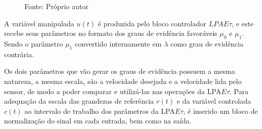 \begin{figure}[!h]
\label{fig:diagramaBlocosLPAEt}

{\vspace{0.2cm} \small Fonte: Próprio autor}
\end{figure}



A variável manipulada $u(t)$ é produzida pelo 
bloco controlador $LPAE\tau$, 
e este recebe seus parâmetros no formato dos 
graus de evidência favoráveis $\mu_0$ e $\mu_1$.
Sendo o parâmetro $\mu_1$ 
convertido internamente em $\lambda$ 
como grau de evidência contrária.

Os dois parâmetros que vão gerar os graus de evidência 
possuem a mesma natureza, a mesma escala, 
são a velocidade desejada e a velocidade lida pelo sensor,
de modo a poder comparar e utilizá-las nas operações da
LPA$E\tau$. 
Para adequação da escala das grandezas 
de referência $r(t)$ e da variável controlada $c(t)$
ao intervalo de trabalho dos parâmetros da LPA$E\tau$, 
é inserido um bloco de normalização do sinal em cada entrada,
bem como na saída.


